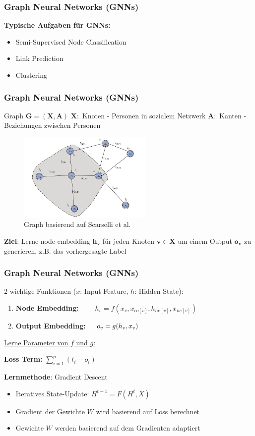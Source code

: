 \documentclass{beamer}
\begin{document}
\begin{frame}
  \frametitle{Graph Neural Networks (GNNs)}
  \textbf{Typische Aufgaben für GNNs:}
  \begin{itemize}
    \item Semi-Supervised Node Classification
    \item Link Prediction
    \item Clustering
  \end{itemize}
\end{frame}

\begin{frame}
  \frametitle{Graph Neural Networks (GNNs)}
  Graph $\boldsymbol{G = (X, A)}$\newline
  $\boldsymbol{X}:$ Knoten - Personen in sozialem Netzwerk\newline
  $\boldsymbol{A}:$ Kanten - Beziehungen zwischen Personen
  \begin{figure}
    \centering
    \includegraphics[width=0.575\textwidth]{img/graph.png}
    \caption*{Graph basierend auf Scarselli et al. \cite{Liu_2020}}
  \end{figure}
  \textbf{Ziel}: Lerne node embedding $\boldsymbol{h_v}$ für jeden Knoten $\boldsymbol{v} \in \boldsymbol{X}$ um 
  einem Output $\boldsymbol{o_v}$ zu generieren, z.B. das vorhergesagte Label
\end{frame}

\begin{frame}
  \frametitle{Graph Neural Networks (GNNs)}

  $2$ wichtige Funktionen ($x$: Input Feature, $h$: Hidden State):
  \begin{enumerate}
    \item \textbf{Node Embedding:} $\quad\quad h_v = f(x_v, x_{co[v]}, h_{ne[v]}, x_{ne[v]})$
    \item \textbf{Output Embedding:} $\quad\thinspace o_v = g(h_v, x_v)$
  \end{enumerate}

  \underline{Lerne Parameter von $f$ und $g$:}

  \textbf{Loss Term:} $\sum_{i=1}^p (t_i - o_i)$

  \textbf{Lernmethode}: Gradient Descent
  \begin{itemize}
    \item Iteratives State-Update: $H^{t+1} = F(H^t, X)$
    \item Gradient der Gewichte $W$ wird basierend auf Loss berechnet
    \item Gewichte $W$ werden basierend auf dem Gradienten adaptiert
  \end{itemize}
\end{frame}
\end{document}
